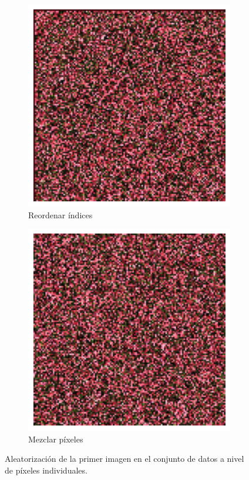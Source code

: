 \documentclass{article}
\begin{document}
\begin{figure}
	\centering
	\begin{subfigure}[b]{0.24\textwidth}
		\includegraphics[width= \textwidth]{alea1}
		\caption{Reordenar índices}
		\label{fg:alea1}
	\end{subfigure}
	\begin{subfigure}[b]{0.24\textwidth}
		\includegraphics[width= \textwidth]{alea2}
		\caption{Mezclar píxeles}
		\label{fg:alea2}
	\end{subfigure}
	\caption{Aleatorización de la primer imagen en el conjunto de datos a nivel de píxeles individuales.}
\end{figure}
\end{document}
